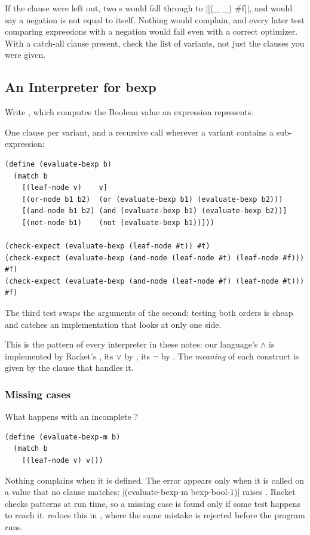 \begin{pitfall}
If the  clause were left out, two s would fall through to \rkt|[(_ _) #f]|, and  would say a negation is not equal to itself. Nothing would complain, and every later test comparing expressions with a negation would fail even with a correct optimizer. With a catch-all clause present, check the list of variants, not just the clauses you were given.
\end{pitfall}

\subsection{An Interpreter for bexp}

\begin{exercise}[Interpreter]
Write , which computes the Boolean value an expression represents.
\end{exercise}
\begin{solution}
One clause per variant, and a recursive call wherever a variant contains a sub-expression:
\begin{lstlisting}
(define (evaluate-bexp b)
  (match b
    [(leaf-node v)    v]
    [(or-node b1 b2)  (or (evaluate-bexp b1) (evaluate-bexp b2))]
    [(and-node b1 b2) (and (evaluate-bexp b1) (evaluate-bexp b2))]
    [(not-node b1)    (not (evaluate-bexp b1))]))

(check-expect (evaluate-bexp (leaf-node #t)) #t)
(check-expect (evaluate-bexp (and-node (leaf-node #t) (leaf-node #f))) #f)
(check-expect (evaluate-bexp (and-node (leaf-node #f) (leaf-node #t))) #f)
\end{lstlisting}
The third test swaps the arguments of the second; testing both orders is cheap and catches an implementation that looks at only one side.
\end{solution}

This is the pattern of every interpreter in these notes: our language's $\land$ is implemented by Racket's , its $\lor$ by , its $\neg$ by . The \emph{meaning} of each construct is given by the clause that handles it.

\subsubsection{Missing cases} What happens with an incomplete ?
\begin{lstlisting}
(define (evaluate-bexp-m b)
  (match b
    [(leaf-node v) v]))
\end{lstlisting}
Nothing complains when it is defined. The error appears only when it is called on a value that no clause matches: \rkt|(evaluate-bexp-m bexp-bool-1)| raises . Racket checks patterns at run time, so a missing case is found only if some test happens to reach it.  redoes this in , where the same mistake is rejected before the program runs.

